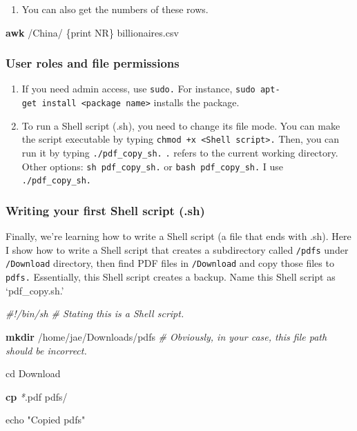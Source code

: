 \documentclass[
]{book}
\newenvironment{Shaded}{\begin{snugshade}}{\end{snugshade}}
\newcommand{\BuiltInTok}[1]{#1}
\newcommand{\CommentTok}[1]{\textcolor[rgb]{0.56,0.35,0.01}{\textit{#1}}}
\newcommand{\FunctionTok}[1]{\textcolor[rgb]{0.13,0.29,0.53}{\textbf{#1}}}
\newcommand{\NormalTok}[1]{#1}
\newcommand{\PreprocessorTok}[1]{\textcolor[rgb]{0.56,0.35,0.01}{\textit{#1}}}
\newcommand{\StringTok}[1]{\textcolor[rgb]{0.31,0.60,0.02}{#1}}
\providecommand{\tightlist}{%
  \setlength{\itemsep}{0pt}\setlength{\parskip}{0pt}}
\begin{document}
\begin{enumerate}
\def\labelenumi{\arabic{enumi}.}
\setcounter{enumi}{3}
\tightlist
\item
  You can also get the numbers of these rows.
\end{enumerate}

\begin{Shaded}
\begin{Highlighting}[]
\FunctionTok{awk} \StringTok{\textquotesingle{}/China/ \{print NR\}\textquotesingle{}}\NormalTok{ billionaires.csv}
\end{Highlighting}
\end{Shaded}

\subsubsection{User roles and file permissions}\label{user-roles-and-file-permissions}

\begin{enumerate}
\def\labelenumi{\arabic{enumi}.}
\item
  If you need admin access, use \texttt{sudo.} For instance, \texttt{sudo\ apt-get\ install\ \textless{}package\ name\textgreater{}} installs the package.
\item
  To run a Shell script (.sh), you need to change its file mode. You can make the script executable by typing \texttt{chmod\ +x\ \textless{}Shell\ script\textgreater{}.} Then, you can run it by typing \texttt{./pdf\_copy\_sh.} \texttt{.} refers to the current working directory. Other options: \texttt{sh\ pdf\_copy\_sh.} or \texttt{bash\ pdf\_copy\_sh.} I use \texttt{./pdf\_copy\_sh.}
\end{enumerate}

\subsubsection{Writing your first Shell script (.sh)}\label{writing-your-first-shell-script-.sh}

Finally, we're learning how to write a Shell script (a file that ends with .sh). Here I show how to write a Shell script that creates a subdirectory called \texttt{/pdfs} under \texttt{/Download} directory, then find PDF files in \texttt{/Download} and copy those files to \texttt{pdfs.} Essentially, this Shell script creates a backup. Name this Shell script as `pdf\_copy.sh.'

\begin{Shaded}
\begin{Highlighting}[]
\CommentTok{\#!/bin/sh \# Stating this is a Shell script.}

\FunctionTok{mkdir}\NormalTok{ /home/jae/Downloads/pdfs }\CommentTok{\# Obviously, in your case, this file path should be incorrect.}

\BuiltInTok{cd}\NormalTok{ Download}

\FunctionTok{cp} \PreprocessorTok{*}\NormalTok{.pdf pdfs/}

\BuiltInTok{echo} \StringTok{"Copied pdfs"}
\end{Highlighting}
\end{Shaded}
\end{document}
